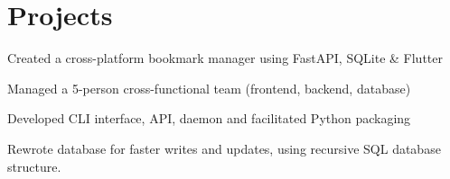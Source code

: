 \documentclass[]{resume-template}
\begin{document}
    \hfill
    \begin{minipage}[t]{0.66\textwidth}


        \section{Projects}\label{sec:projects}

        \label{subsec: Bookie}
        \vspace{\topsep}
        \begin{tightemize}
            \item Created a cross-platform bookmark manager using FastAPI, SQLite \& Flutter
            \item Managed a 5-person cross-functional team (frontend, backend, database)
            \item Developed CLI interface, API, daemon and facilitated Python packaging
            \item Rewrote database for faster writes and updates, using recursive SQL database structure. \\
        \end{tightemize}
        \vspace{\topsep}



\end{minipage}
\end{document}
